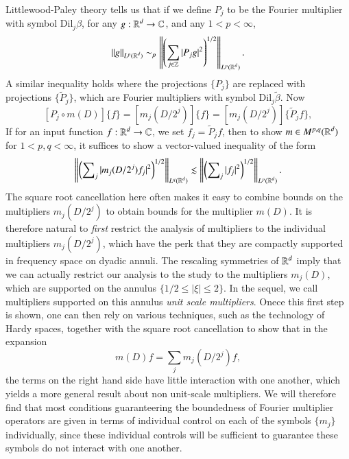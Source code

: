 Littlewood-Paley theory tells us that if we define $P_j$ to be the Fourier multiplier with symbol $\text{Dil}_j \beta$, for any $g: \operatorname{\mathbb{R}}^d \to \operatorname{\mathbb{C}}$, and any $1 < p < \infty$,
%
\[ \| g \|_{L^p(\operatorname{\mathbb{R}}^d)} \sim_p \left\| \left( \sum_{j \in \operatorname{\mathbb{Z}}} |P_j g|^2 \right)^{1/2} \right\|_{L^p(\operatorname{\mathbb{R}}^d)}. \]
%
A similar inequality holds where the projections $\{ P_j \}$ are replaced with projections $\{ \tilde{P}_j \}$, which are Fourier multipliers with symbol $\text{Dil}_j \tilde{\beta}$. Now
%
\[ [P_j \circ m(D)] \{ f \} = [m_j(D / 2^j)] \{ f \} = [m_j(D/2^j)] \{ \tilde{P}_j f \}, \]
%
If for an input function $f: \operatorname{\mathbb{R}}^d \to \operatorname{\mathbb{C}}$, we set $f_j = \tilde{P}_j f$, then to show $m \in M^{p,q}(\operatorname{\mathbb{R}}^d)$ for $1 < p,q < \infty$, it suffices to show a vector-valued inequality of the form
%
\[ \left\| \left( \sum\nolimits_j |m_j(D/2^j) f_j|^2 \right)^{1/2} \right\|_{L^q(\operatorname{\mathbb{R}}^d)} \lesssim \left\| \left( \sum\nolimits_j |f_j|^2 \right)^{1/2} \right\|_{L^p(\operatorname{\mathbb{R}}^d)}. \]
%
The square root cancellation here often makes it easy to combine bounds on the multipliers $m_j(D/2^j)$ to obtain bounds for the multiplier $m(D)$. It is therefore natural to \emph{first} restrict the analysis of multipliers to the individual multipliers $m_j(D/2^j)$, which have the perk that they are compactly supported in frequency space on dyadic annuli. The rescaling symmetries of $\operatorname{\mathbb{R}}^d$ imply that we can actually restrict our analysis to the study to the multipliers $m_j(D)$, which are supported on the annulus $\{ 1/2 \leq |\xi| \leq 2 \}$. In the sequel, we call multipliers supported on this annulus \emph{unit scale multipliers}. Onece this first step is shown, one can then rely on various techniques, such as the technology of Hardy spaces, together with the square root cancellation to show that in the expansion
%
\[ m(D) f = \sum_j m_j(D/2^j) f, \]
%
the terms on the right hand side have little interaction with one another, which yields a more general result about non unit-scale multipliers. We will therefore find that most conditions guaranteering the boundedness of Fourier multiplier operators are given in terms of individual control on each of the symbols $\{ m_j \}$ individually, since these individual controls will be sufficient to guarantee these symbols do not interact with one another.

